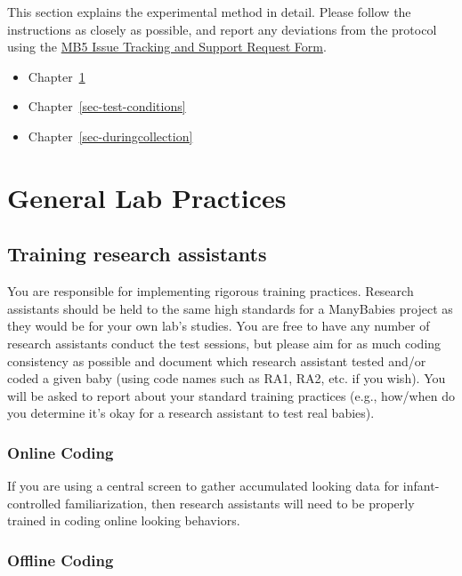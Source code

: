 \documentclass[
  letterpaper,
  DIV=11,
  numbers=noendperiod,
  oneside]{scrreprt}
\providecommand{\tightlist}{%
  \setlength{\itemsep}{0pt}\setlength{\parskip}{0pt}}
\begin{document}
This section explains the experimental method in detail. Please follow
the instructions as closely as possible, and report any deviations from
the protocol using the
\href{https://airtable.com/appRoqMKzcK3NsXt4/pagGafhoHcuVMs7ZV/form}{MB5
Issue Tracking and Support Request Form}.

\begin{itemize}
\tightlist
\item
  Chapter~\ref{sec-genlab}
\item
  Chapter~\ref{sec-test-conditions}
\item
  Chapter~\ref{sec-duringcollection}
\end{itemize}

\chapter{General Lab Practices}\label{sec-genlab}

\section{Training research
assistants}\label{training-research-assistants}

You are responsible for implementing rigorous training practices.
Research assistants should be held to the same high standards for a
ManyBabies project as they would be for your own lab's studies. You are
free to have any number of research assistants conduct the test
sessions, but please aim for as much coding consistency as possible and
document which research assistant tested and/or coded a given baby
(using code names such as RA1, RA2, etc. if you wish). You will be asked
to report about your standard training practices (e.g., how/when do you
determine it's okay for a research assistant to test real babies).

\subsection{Online Coding}\label{online-coding}

If you are using a central screen to gather accumulated looking data for
infant-controlled familiarization, then research assistants will need to
be properly trained in coding online looking behaviors.

\subsection{Offline Coding}\label{offline-coding}
\end{document}
